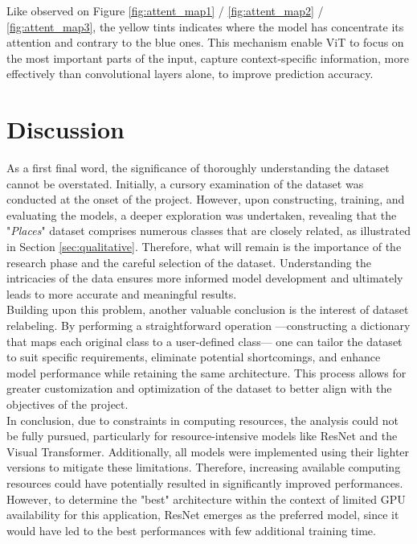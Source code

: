 \documentclass[twocolumn,superscriptaddress,aps]{revtex4-1}
\begin{document}
Like observed on Figure \ref{fig:attent_map1} /  \ref{fig:attent_map2} / \ref{fig:attent_map3}, the yellow tints indicates where the model has concentrate its attention and contrary to the blue ones. This mechanism enable ViT to focus on the most important parts of the input, capture context-specific information, more effectively than convolutional layers alone, to improve prediction accuracy.

\section{Discussion}

As a first final word, the significance of thoroughly understanding the dataset cannot be overstated. Initially, a cursory examination of the dataset was conducted at the onset of the project. However, upon constructing, training, and evaluating the models, a deeper exploration was undertaken, revealing that the "\textit{Places}" dataset comprises numerous classes that are closely related, as illustrated in Section \ref{sec:qualitative}. Therefore, what will remain is the importance of the research phase and the careful selection of the dataset. Understanding the intricacies of the data ensures more informed model development and ultimately leads to more accurate and meaningful results.\\

Building upon this problem, another valuable conclusion is the interest of dataset relabeling. By performing a straightforward operation —constructing a dictionary that maps each original class to a user-defined class— one can tailor the dataset to suit specific requirements, eliminate potential shortcomings, and enhance model performance while retaining the same architecture. This process allows for greater customization and optimization of the dataset to better align with the objectives of the project.\\

In conclusion, due to constraints in computing resources, the analysis could not be fully pursued, particularly for resource-intensive models like ResNet and the Visual Transformer. Additionally, all models were implemented using their lighter versions to mitigate these limitations. Therefore, increasing available computing resources could have potentially resulted in significantly improved performances. However, to determine the "best" architecture within the context of limited GPU availability for this application, ResNet emerges as the preferred model, since it would have led to the best performances with few additional training time. 





\end{document}
